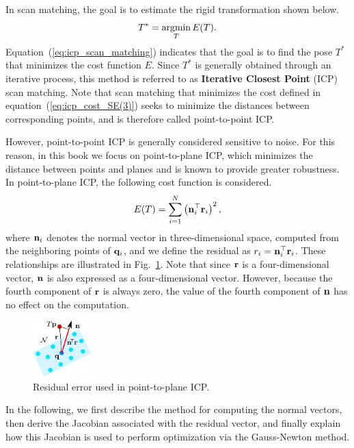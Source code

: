 In scan matching, the goal is to estimate the rigid transformation shown below.
%
\begin{align}
  T^{*} = \mathop{\rm argmin}\limits_{T} E(T).
  \label{eq:icp_scan_matching}
\end{align}
%
Equation~(\ref{eq:icp_scan_matching}) indicates that the goal is to find the pose $T^{*}$ that minimizes the cost function $E$.
Since $T^{*}$ is generally obtained through an iterative process, this method is referred to as {\bf Iterative Closest Point} (ICP) scan matching.
Note that scan matching that minimizes the cost defined in equation~(\ref{eq:icp_cost_SE(3)}) seeks to minimize the distances between corresponding points, and is therefore called point-to-point ICP.

However, point-to-point ICP is generally considered sensitive to noise.
For this reason, in this book we focus on point-to-plane ICP, which minimizes the distance between points and planes and is known to provide greater robustness.
In point-to-plane ICP, the following cost function is considered.
%
\begin{align}
  E(T) = \sum_{i=1}^{N} \left( {\bf n}_{i}^{\top} {\bf r}_{i} \right)^{2},
  \label{eq:point-to-plane_icp_cost_SE(3)}
\end{align}
%
where ${\bf n}_{i}$ denotes the normal vector in three-dimensional space, computed from the neighboring points of ${\bf q}_{i}$, and we define the residual as $r_{i} = {\bf n}_{i}^{\top} {\bf r}_{i}$.
These relationships are illustrated in Fig.~\ref{fig:normal_residual}.
Note that since ${\bf r}$ is a four-dimensional vector, ${\bf n}$ is also expressed as a four-dimensional vector.
However, because the fourth component of ${\bf r}$ is always zero, the value of the fourth component of ${\bf n}$ has no effect on the computation.

\begin{figure}[!t]
  \centering
  \includegraphics[width=0.2\textwidth]{../figs/normal_residual.pdf}
  \caption{Residual error used in point-to-plane ICP.}
  \label{fig:normal_residual}
\end{figure}

In the following, we first describe the method for computing the normal vectors, then derive the Jacobian associated with the residual vector, and finally explain how this Jacobian is used to perform optimization via the Gauss-Newton method.










